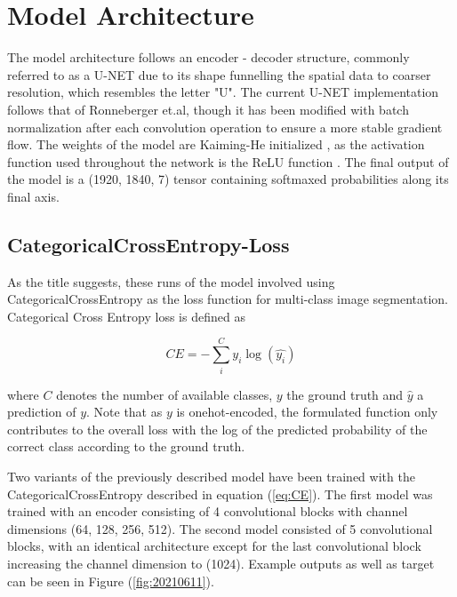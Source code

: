 \documentclass[../main/thesis]{subfiles}
\begin{document}
\section{Model Architecture}
The model architecture follows an encoder - decoder structure, commonly referred to as a U-NET \cite{Ronneberger2015} due to its shape funnelling the spatial data to coarser resolution, which resembles the letter "U". The current U-NET implementation follows that of Ronneberger et.al, though it has been modified with batch normalization after each convolution operation to ensure a more stable gradient flow. The weights of the model are Kaiming-He initialized \cite{He2015}, as the activation function used throughout the network is the ReLU function \cite{Nair2010}. The final output of the model is a (1920, 1840, 7) tensor containing softmaxed probabilities along its final axis.

\subsection{CategoricalCrossEntropy-Loss}
As the title suggests, these runs of the model involved using CategoricalCrossEntropy as the loss function for multi-class image segmentation. Categorical Cross Entropy loss is defined as 

\begin{equation}
    \label{eq:CE}
    CE = - \sum_i^C y_i\log{(\hat{y_i})}
\end{equation}

where $C$ denotes the number of available classes, $y$ the ground truth and $\hat{y}$ a prediction of $y$. Note that as $y$ is onehot-encoded, the formulated function only contributes to the overall loss with the log of the predicted probability of the correct class according to the ground truth.

Two variants of the previously described model have been trained with the CategoricalCrossEntropy described in equation (\ref{eq:CE}). The first model was trained with an encoder consisting of 4 convolutional blocks with channel dimensions (64, 128, 256, 512). The second model consisted of 5 convolutional blocks, with an identical architecture except for the last convolutional block increasing the channel dimension to (1024). Example outputs as well as target can be seen in Figure (\ref{fig:20210611}).
\end{document}
